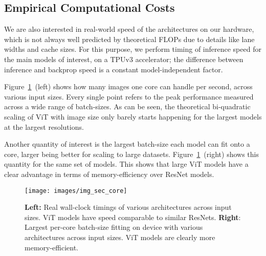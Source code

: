 \documentclass{article} \usepackage{iclr2021_conference,times}
\begin{document}
\subsection{Empirical Computational Costs}
\label{sec:empirical_computation}

We are also interested in real-world speed of the architectures on our hardware, which is not always well predicted by theoretical FLOPs due to details like lane widths and cache sizes.
For this purpose, we perform timing of inference speed for the main models of interest, on a TPUv3 accelerator; the difference between inference and backprop speed is a constant model-independent factor.

Figure~\ref{fig:real_time}~(left) shows how many images one core can handle per second, across various input sizes.
Every single point refers to the peak performance measured across a wide range of batch-sizes.
As can be seen, the theoretical bi-quadratic scaling of ViT with image size only barely starts happening for the largest models at the largest resolutions.

Another quantity of interest is the largest batch-size each model can fit onto a core, larger being better for scaling to large datasets.
Figure~\ref{fig:real_time}~(right) shows this quantity for the same set of models.
This shows that large ViT models have a clear advantage in terms of memory-efficiency over ResNet models.

\begin{figure}[h]
\begin{center}
\texttt{[image: images/img\_sec\_core]}
\end{center}
\caption{\textbf{Left:} Real wall-clock timings of various architectures across input sizes. ViT models have speed comparable to similar ResNets.
\textbf{Right}: Largest per-core batch-size fitting on device with various architectures across input sizes. ViT models are clearly more memory-efficient.}
\label{fig:real_time}
\end{figure}
\end{document}
